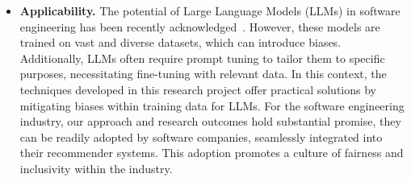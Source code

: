 \begin{itemize}


	
	\item \textbf{Applicability.} The potential of Large Language Models (LLMs) in software engineering has been recently acknowledged~\cite{10109345}. However, these models are trained on vast and diverse datasets, which can introduce biases. Additionally, LLMs often require prompt tuning to tailor them to specific purposes, necessitating fine-tuning with relevant data. 
	In this context, the techniques developed in this research project offer practical solutions by mitigating biases within training data for LLMs. For the software engineering industry, our approach and research outcomes hold substantial promise, \ie they can be readily adopted by software companies, seamlessly integrated into their recommender systems. This adoption promotes a culture of fairness and inclusivity within the industry. %
	

\end{itemize}
